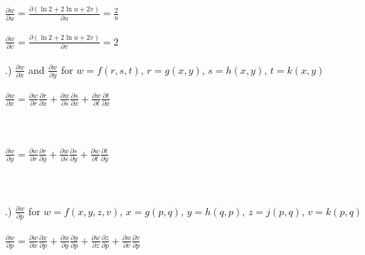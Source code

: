 \documentclass[12pt]{article}
\begin{document}
\noindent $\frac{\partial w}{\partial u} = \frac{\partial (\ln{2} + 2\ln{u} + 2v)}{\partial u} = \frac{2}{u}$\\\\

\noindent $\frac{\partial w}{\partial v} = \frac{\partial (\ln{2} + 2\ln{u} + 2v)}{\partial v} = 2$\\\\


.) $\frac{\partial w}{\partial x}$ and $\frac{\partial w}{\partial y}$ for $w = f(r,s,t)$,
 \hspace{10pt} $r = g(x,y)$, \hspace{10pt} $s = h(x,y)$, \hspace{10pt} $t = k(x,y)$\\\\

\noindent $\frac{\partial w}{\partial x} = \frac{\partial w}{\partial r}\frac{\partial r}{\partial x} 
+ \frac{\partial w}{\partial s}\frac{\partial s}{\partial x} + \frac{\partial w}{\partial t}\frac{\partial t}{\partial x}$ \\\\
\vspace{6cm}\\\\




\noindent $\frac{\partial w}{\partial y} = \frac{\partial w}{\partial r}\frac{\partial r}{\partial y} 
+ \frac{\partial w}{\partial s}\frac{\partial s}{\partial y} + \frac{\partial w}{\partial t}\frac{\partial t}{\partial y}$ \\\\
\vspace{6cm}\\\\



.) $\frac{\partial w}{\partial p}$ for $w = f(x,y,z,v)$, \hspace{10pt} $x = g(p,q)$, 
\hspace{10pt} $y = h(q,p)$, \hspace{10pt} $z = j(p,q)$, \hspace{10pt} $v = k(p,q)$\\\\
\noindent $\frac{\partial w}{\partial p} = \frac{\partial w}{\partial x}\frac{\partial x}{\partial p} 
+ \frac{\partial w}{\partial y}\frac{\partial y}{\partial p} + \frac{\partial w}{\partial z}\frac{\partial z}{\partial p} +
 \frac{\partial w}{\partial v}\frac{\partial v}{\partial p}$\\\\
\vspace{6cm}\\\\
\end{document}
